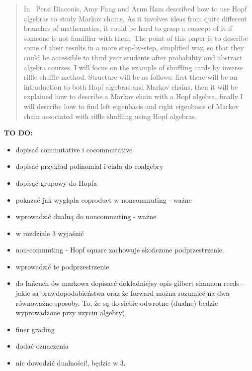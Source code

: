\documentclass[a4paper, 12pt]{report}
\newcommand{\todo}[1]{\hfill \break \textbf{\Huge TO DO: #1 \hfill \break}\normalsize}
\begin{document}
\begin{abstract}

In~\cite{Diaconis2014} Persi Diaconis, Amy Pang and Arun Ram described how to use Hopf algebras to
study Markov chains. As it involves ideas from quite different branches of mathematics, it could be hard to
grasp a concept of it if someone is not familliar with them.
The point of this paper is to describe some of their results in a more step-by-step, simplified way,
so that they could be accessible to third year students after probability
and abstract algebra courses. I will focus on the example of shuffling cards by inverse riffle shuffle
method. Structure will be as follows: first there will be an introduction to both Hopf algebras and Markov
chains, then it will be explained how to describe a Markov chain with a Hopf algebra, finally I will
describe how to find left eigenbasis and right eigenbasis of Markov chain associated with riffle shuffling
using Hopf algebras.


\end{abstract}
\todo{}
\begin{itemize}
\item dopisać commutative i cocommutative
\item dopisać przykład polinomial i ciała do coalgebry
\item dopisąć grupowy do Hopfa
\item pokazać jak wygląda coproduct w noncommuting - ważne
\item wprowadzić dualną do noncommuting - ważne
\item w rozdziale 3 wyjaśnić
\item non-commuting - Hopf square zachowuje skończone podprzestrzenie.
\item wprowadzić te podprzestrzenie
\item do łańcuch ów markowa dopisacć dokładniejsy opis gilbert shannon reeds - jakie sa prawdopodobieństwa
oraz że forward można rozumieć na dwa równoważne sposoby. To, że są do siebie odwrotne (dualne) będzie
wyprowadzone przy uzyciu algebry).
\item finer grading
\item dodać oznaczenia
\item nie dowodzić dualności!, będzie w 3.
\end{itemize}
\end{document}
